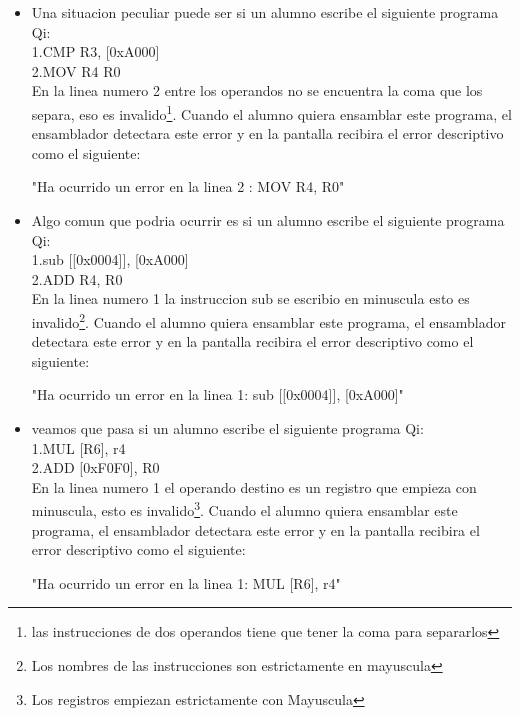 \begin{itemize}
"Ha ocurrido un error en la linea 1 : ADD R0, [0x0002]" \\ 

\item Una situacion peculiar puede ser si un alumno escribe el siguiente programa Qi:\\

1.CMP R3, [0xA000] \\
2.MOV R4 R0 \\

En la linea numero 2 entre los operandos no se encuentra la coma que los separa, eso es invalido\footnote{las instrucciones de dos operandos tiene que tener la coma para separarlos}. Cuando el alumno quiera ensamblar este programa, el ensamblador detectara este error y en la pantalla recibira el error descriptivo como el siguiente:

"Ha ocurrido un error en la linea 2 : MOV R4, R0" \\ 

\item Algo comun que podria ocurrir es si un alumno escribe el siguiente programa Qi:\\

1.sub [[0x0004]], [0xA000] \\
2.ADD R4, R0 \\

En la linea numero 1 la instruccion sub se escribio en minuscula esto es invalido\footnote{Los nombres de las instrucciones son estrictamente en mayuscula}. Cuando el alumno quiera ensamblar este programa, el ensamblador detectara este error y en la pantalla recibira el error descriptivo como el siguiente:

"Ha ocurrido un error en la linea 1: sub [[0x0004]], [0xA000]" \\ 

\item veamos que pasa si un alumno escribe el siguiente programa Qi:\\

1.MUL [R6], r4 \\
2.ADD [0xF0F0], R0 \\

En la linea numero 1 el operando destino es un registro que empieza con minuscula, esto es invalido\footnote{Los registros empiezan estrictamente con Mayuscula}. Cuando el alumno quiera ensamblar este programa, el ensamblador detectara este error y en la pantalla recibira el error descriptivo como el siguiente:

"Ha ocurrido un error en la linea 1: MUL [R6], r4" \\ 


\end{itemize}
